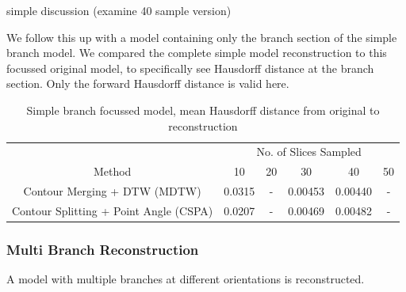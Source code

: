 \documentclass[11p, titlepage]{article}
\begin{document}
simple discussion (examine 40 sample version)

We follow this up with a model containing only the branch section of the simple branch model. We compared the complete simple model reconstruction to this focussed original model, to specifically see Hausdorff distance at the branch section. Only the forward Hausdorff distance is valid here.

\begin{table}[h!]
\begin{tabular}{ | c | c | c | c | c | c | }
\hline
& \multicolumn{5}{c|}{No. of Slices Sampled} \\
\cline{2-6}
Method & 10 & 20 & 30 & 40 & 50 \\
\hline
Contour Merging + DTW (MDTW) & 0.0315 & - & 0.00453 & 0.00440 & - \\
Contour Splitting + Point Angle (CSPA) & 0.0207 & - & 0.00469 & 0.00482 & - \\
\hline
\end{tabular}
\caption{Simple branch focussed model, mean Hausdorff distance from original to reconstruction}
\label{table:simple_branch_focussed_forward}
\end{table}
\pagebreak

\subsubsection{Multi Branch Reconstruction}

A model with multiple branches at different orientations is reconstructed.
\end{document}
